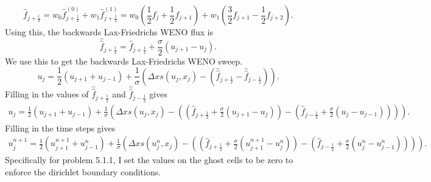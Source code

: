 \documentclass{article}
\def\^{\hat}
\def\l{\left}
\def\r{\right}
\begin{document}
\begin{equation}\label{eq:f_hat2}
    \^ f_{j + \frac{1}{2}} = w_0 \^ f_{j + \frac{1}{2}}^{(0)} +  w_1 \^ f_{j + \frac{1}{2}}^{(1)} = w_0 \l(\frac{1}{2} f_{j} + \frac{1}{2} f_{j + 1}\r) +  w_1 \l(\frac{3}{2} f_{j+1} - \frac{1}{2} f_{j+2}\r).
\end{equation}
Using this, the backwards Lax-Friedrichs WENO flux is
\begin{equation*}
    \^{\^{f}}_{j + \frac{1}{2}} = \^f_{j + \frac{1}{2}} + \frac{\sigma}{2}(u_{j+1} - u_j).
\end{equation*}
We use this to get the backwards Lax-Friedrichs WENO sweep.
\begin{equation*}
    u_{j} = \frac{1}{2}(u_{j+1} + u_{j-1}) + \frac{1}{\sigma}(\Delta x s(u_j,x_j) - (\^{\^{f}}_{j + \frac{1}{2}} - \^{\^{f}}_{j - \frac{1}{2}})).
\end{equation*}
Filling in the values of $\^{\^{f}}_{j + \frac{1}{2}}$ and $\^{\^{f}}_{j - \frac{1}{2}}$ gives
\begin{align*}    
     u_{j} = \frac{1}{2}(u_{j+1} + u_{j-1}) + \frac{1}{\sigma}(\Delta x s(u_j,x_j) - ((\^f_{j + \frac{1}{2}} + \frac{\sigma}{2}(u_{j+1} - u_j)) -  (\^f_{j - \frac{1}{2}} + \frac{\sigma}{2}(u_{j} - u_{j-1})))).
\end{align*}
Filling in the time steps gives
\begin{align*}    
    u^{n+1}_{j} = \frac{1}{2}(u^{n+1}_{j+1} + u^n_{j-1}) + \frac{1}{\sigma}(\Delta x s(u^n_j,x_j) - ((\^f_{j + \frac{1}{2}} + \frac{\sigma}{2}(u^{n+1}_{j+1} - u^n_j)) -  (\^f_{j - \frac{1}{2}} + \frac{\sigma}{2}(u^n_{j} - u^n_{j-1})))).
\end{align*}
Specifically for problem 5.1.1, I set the values on the ghost cells to be zero to enforce the dirichlet boundary conditions.
\end{document}
